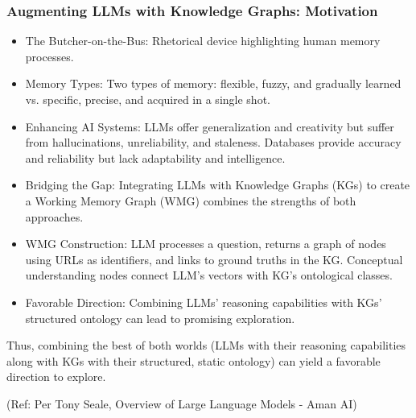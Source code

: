 \begin{frame}[fragile]\frametitle{Augmenting LLMs with Knowledge Graphs: Motivation}

\begin{itemize}
\item The Butcher-on-the-Bus: Rhetorical device highlighting human memory processes.
\item Memory Types: Two types of memory: flexible, fuzzy, and gradually learned vs. specific, precise, and acquired in a single shot.
\item Enhancing AI Systems: LLMs offer generalization and creativity but suffer from hallucinations, unreliability, and staleness. Databases provide accuracy and reliability but lack adaptability and intelligence.
\item Bridging the Gap: Integrating LLMs with Knowledge Graphs (KGs) to create a Working Memory Graph (WMG) combines the strengths of both approaches.
\item WMG Construction: LLM processes a question, returns a graph of nodes using URLs as identifiers, and links to ground truths in the KG. Conceptual understanding nodes connect LLM's vectors with KG's ontological classes.
\item Favorable Direction: Combining LLMs' reasoning capabilities with KGs' structured ontology can lead to promising exploration.
\end{itemize}

Thus, combining the best of both worlds (LLMs with their reasoning capabilities along with KGs with their structured, static ontology) can yield a favorable direction to explore.

{\tiny (Ref: Per Tony Seale, Overview of Large Language Models - Aman AI)}

\end{frame}

